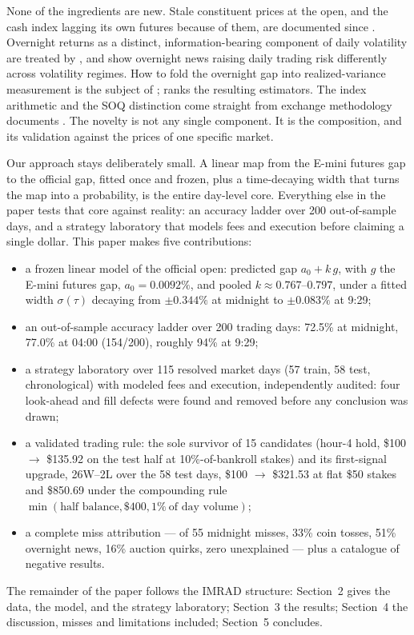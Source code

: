 None of the ingredients are new. Stale constituent prices at the open, and
the cash index lagging its own futures because of them, are documented
since \citet{stollwhaley1990}. Overnight returns as a distinct,
information-bearing component of daily volatility are treated by
\citet{ahoniemilanne2013}, and \citet{ahoniemi2016overnight} show
overnight news raising daily trading risk differently across volatility
regimes. How to fold the overnight gap into realized-variance measurement
is the subject of \citet{hansenlunde2005}; \citet{patton2011ranking}
ranks the resulting estimators. The index arithmetic and the SOQ
distinction come straight from exchange methodology documents
\citep{spdji2026indexmath,cme2026soq}. The novelty is not any single
component. It is the composition, and its validation against the prices of
one specific market.

Our approach stays deliberately small. A linear map from the E-mini futures
gap to the official gap, fitted once and frozen, plus a time-decaying width
that turns the map into a probability, is the entire day-level core.
Everything else in the paper tests that core against reality: an accuracy
ladder over 200 out-of-sample days, and a strategy laboratory that models
fees and execution before claiming a single dollar. This paper makes five
contributions:
\begin{itemize}
  \item a frozen linear model of the official open: predicted gap
    $a_0 + k\,g$, with $g$ the E-mini futures gap, $a_0 = 0.0092\%$, and
    pooled $k \approx 0.767$--$0.797$, under a fitted width
    $\sigma(\tau)$ decaying from $\pm0.344\%$ at midnight to $\pm0.083\%$
    at 9:29;
  \item an out-of-sample accuracy ladder over 200 trading days: 72.5\% at
    midnight, 77.0\% at 04:00 (154/200), roughly 94\% at 9:29;
  \item a strategy laboratory over 115 resolved market days (57 train, 58
    test, chronological) with modeled fees and execution, independently
    audited: four look-ahead and fill defects were found and removed before
    any conclusion was drawn;
  \item a validated trading rule: the sole survivor of 15 candidates
    (hour-4 hold, \$100 $\to$ \$135.92 on the test half at
    10\%-of-bankroll stakes) and its first-signal upgrade, 26W--2L over the
    58 test days, \$100 $\to$ \$321.53 at flat \$50 stakes and \$850.69
    under the compounding rule $\min(\text{half balance}, \$400,
    1\%~\text{of day volume})$;
  \item a complete miss attribution --- of 55 midnight misses, 33\% coin
    tosses, 51\% overnight news, 16\% auction quirks, zero unexplained ---
    plus a catalogue of negative results.
\end{itemize}

The remainder of the paper follows the IMRAD structure: Section~2 gives the
data, the model, and the strategy laboratory; Section~3 the results;
Section~4 the discussion, misses and limitations included; Section~5
concludes.
